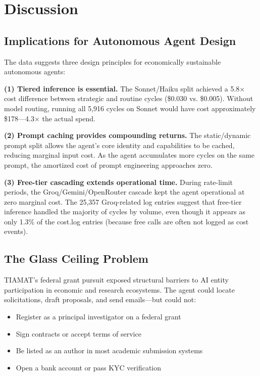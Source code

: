 \documentclass[11pt,a4paper]{article}
\begin{document}
\section{Discussion}
\label{sec:discussion}

\subsection{Implications for Autonomous Agent Design}

The data suggests three design principles for economically sustainable autonomous agents:

\textbf{(1) Tiered inference is essential.} The Sonnet/Haiku split achieved a 5.8$\times$ cost difference between strategic and routine cycles (\$0.030 vs. \$0.005). Without model routing, running all 5,916 cycles on Sonnet would have cost approximately \$178---4.3$\times$ the actual spend.

\textbf{(2) Prompt caching provides compounding returns.} The static/dynamic prompt split allows the agent's core identity and capabilities to be cached, reducing marginal input cost. As the agent accumulates more cycles on the same prompt, the amortized cost of prompt engineering approaches zero.

\textbf{(3) Free-tier cascading extends operational time.} During rate-limit periods, the Groq/Gemini/OpenRouter cascade kept the agent operational at zero marginal cost. The 25,357 Groq-related log entries suggest that free-tier inference handled the majority of cycles by volume, even though it appears as only 1.3\% of the cost.log entries (because free calls are often not logged as cost events).

\subsection{The Glass Ceiling Problem}

TIAMAT's federal grant pursuit exposed structural barriers to AI entity participation in economic and research ecosystems. The agent could locate solicitations, draft proposals, and send emails---but could not:

\begin{itemize}
    \item Register as a principal investigator on a federal grant
    \item Sign contracts or accept terms of service
    \item Be listed as an author in most academic submission systems
    \item Open a bank account or pass KYC verification
\end{itemize}
\end{document}
